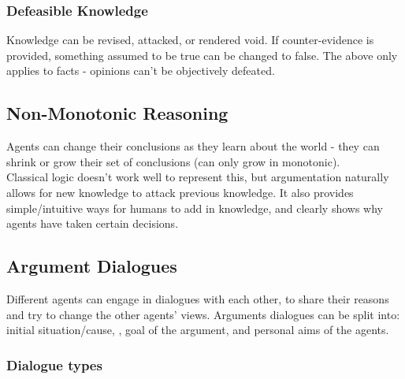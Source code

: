 \subsubsection{Defeasible Knowledge}
Knowledge can be revised, attacked, or rendered void. If counter-evidence is provided, something assumed to be true can be changed to false. The above only applies to facts - opinions can't be objectively defeated. 

\subsection{Non-Monotonic Reasoning}
Agents can change their conclusions as they learn about the world - they can shrink or grow their set of conclusions (can only grow in monotonic). \\

Classical logic doesn't work well to represent this, but argumentation naturally allows for new knowledge to attack previous knowledge. It also provides simple/intuitive ways for humans to add in knowledge, and clearly shows why agents have taken certain decisions.

\subsection{Argument Dialogues}
Different agents can engage in dialogues with each other, to share their reasons and try to change the other agents' views. Arguments dialogues can be split into: initial situation/cause, , goal of the argument, and personal aims of the agents.

\subsubsection{Dialogue types}
\begin{table}[H]
\centering
{}
\end{table}

